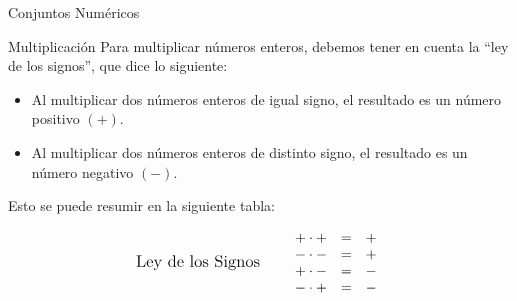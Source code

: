 \documentclass[handout,10pt]{beamer}
\begin{document}
	\begin{frame}{Conjuntos Numéricos}
		\begin{block}{Multiplicación}
			Para multiplicar números enteros, debemos tener en cuenta la ``ley de los signos'', que dice lo siguiente:
			\pause
			
			\begin{itemize}
				\item Al multiplicar dos números enteros de igual signo, el resultado es un número positivo $(+)$.
				\pause
				\item Al multiplicar dos números enteros de distinto signo, el resultado es un número negativo $(-)$.
				\pause
			\end{itemize}
			
			Esto se puede resumir en la siguiente tabla:
			\pause
			
			\[
			\text{\large Ley de los Signos}
			\qquad
			\begin{array}{ccc}
				+\cdot + & = & + \\
				-\cdot - & = & + \\
				+\cdot - & = & - \\
				-\cdot + & = & -
			\end{array}
			\]
		\end{block}
	\end{frame}
	
\end{document}
